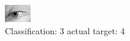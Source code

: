 \begin{figure}[h!]
\begin{center}
\includegraphics[width=0.60\columnwidth]{figures/ID2947_class_3_target_4.png}
\end{center}
\caption{ Classification: 3 actual target: 4}
\label{fig:ID2947_class_3_target_4}
\end{figure}
